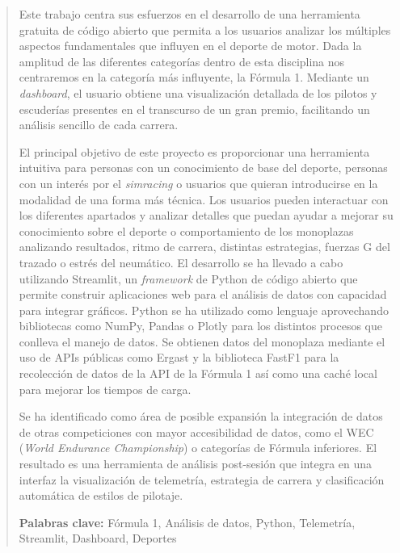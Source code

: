 \documentclass[12pt,a4paper,twoside,openright]{book}
\begin{document}
\renewcommand{\abstractname}{Resumen}
\begin{abstract}
Este trabajo centra sus esfuerzos en el desarrollo de una herramienta gratuita de código abierto
que permita a los usuarios analizar los múltiples aspectos fundamentales que influyen en el deporte de motor.
Dada la amplitud de las diferentes categorías dentro de esta disciplina nos centraremos en la categoría más influyente, la Fórmula 1.
Mediante un \emph{dashboard}, el usuario obtiene una visualización detallada de los pilotos y escuderías presentes en el transcurso de un gran premio, 
facilitando un análisis sencillo de cada carrera.

El principal objetivo de este proyecto es proporcionar una herramienta intuitiva para personas con un conocimiento de base del deporte, 
personas con un interés por el \emph{simracing} o usuarios que quieran introducirse en la modalidad de una forma más técnica.
Los usuarios pueden interactuar con los diferentes apartados y analizar detalles que puedan ayudar a mejorar su conocimiento sobre el deporte o comportamiento de los monoplazas analizando
resultados, ritmo de carrera, distintas estrategias, fuerzas G del trazado o estrés del neumático.
El desarrollo se ha llevado a cabo utilizando Streamlit, un \emph{framework} de Python de código abierto que permite construir aplicaciones web para el análisis de datos con capacidad para integrar
gráficos. Python se ha utilizado como lenguaje aprovechando bibliotecas como NumPy, Pandas o Plotly para los distintos procesos que conlleva el manejo de datos.
Se obtienen datos del monoplaza mediante el uso de APIs públicas como Ergast y la biblioteca FastF1 para la recolección de datos de la API de la Fórmula 1 así
como una caché local para mejorar los tiempos de carga.

\noindent 
Se ha identificado como área de posible expansión la integración de datos de otras competiciones con mayor accesibilidad de datos, como el WEC (\emph{World Endurance Championship}) o categorías de Fórmula inferiores.
El resultado es una herramienta de análisis post-sesión que integra en una interfaz la visualización de telemetría, estrategia de carrera y clasificación automática de estilos de pilotaje.

\noindent\textbf{Palabras clave:} Fórmula 1, Análisis de datos, Python,
Telemetría, Streamlit, Dashboard, Deportes
\end{abstract}
\end{document}

